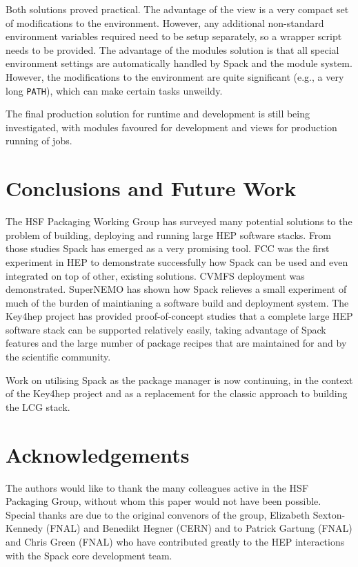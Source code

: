 \documentclass{webofc}
\begin{document}
Both solutions proved practical. The advantage of the view is a very compact
set of modifications to the environment. However, any additional non-standard
environment variables required need to be setup separately, so a wrapper script
needs to be provided. The advantage of the modules solution is that all special
environment settings are automatically handled by Spack and the module system.
However, the modifications to the environment are quite significant (e.g., a
very long \texttt{PATH}), which can make certain tasks unweildy.

The final production solution for runtime and development is still being
investigated, with modules favoured for development and views for production
running of jobs.

\section{Conclusions and Future Work}

The HSF Packaging Working Group has surveyed many potential solutions to the
problem of building, deploying and running large HEP software stacks. From
those studies Spack has emerged as a very promising tool. FCC was the first
experiment in HEP to demonstrate successfully how Spack can be used and even
integrated on top of other, existing solutions. CVMFS deployment was
demonstrated. SuperNEMO has shown how Spack relieves a small experiment of much
of the burden of maintianing a software build and deployment system. The
Key4hep project has provided proof-of-concept studies that a complete large
HEP software stack can be supported relatively easily, taking advantage
of Spack features and the large number of package recipes that are
maintained for and by the scientific community.

Work on utilising Spack as the package manager is now continuing, in the
context of the Key4hep project and as a replacement for the classic approach
to building the LCG stack.

\section*{Acknowledgements}

The authors would like to thank the many colleagues active in the HSF
Packaging Group, without whom this paper would not have been possible.
Special thanks are due to the original convenors of the group,
Elizabeth Sexton-Kennedy (FNAL) and Benedikt Hegner (CERN) and to
Patrick Gartung (FNAL) and Chris Green (FNAL) who have contributed
greatly to the HEP interactions with the Spack core development team.

%

\end{document}
